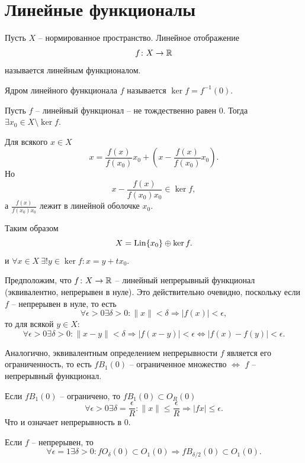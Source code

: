 \section{Линейные функционалы}
\begin{definition}
    Пусть $X$ -- нормированное пространство.
    Линейное отображение
    \[
        f\colon X \to \mathbb{R}
    \]
    называется линейным функционалом.
\end{definition}
\begin{definition}
    Ядром линейного функционала $f$ называется $\ker f = f^{-1}(0)$.
\end{definition}
\begin{note}
    Пусть $f$ -- линейный функционал -- не тождественно равен 0.
    Тогда $\exists x_0 \in X \setminus \ker f$.

    Для всякого $x \in X$ 
    \[
        x = \frac{f(x)}{f(x_0)}x_0 + \left(x - \frac{f(x)}{f(x_0)}x_0\right).
    \]
    Но
    \[
        x - \frac{f(x)}{f(x_0)x_0} \in \ker f,
    \]
    а $\frac{f(x)}{f(x_0)x_0}$ лежит в линейной оболочке $x_0$.

    Таким образом
    \[
        X = \operatorname{Lin}\{x_0\} \oplus \ker f.
    \]
    и $\forall x \in X \ \exists! y \in \ker f\colon x = y + t x_0$.

    Предположим, что $f\colon X \to \mathbb{R}$ -- линейный непрерывный функционал (эквивалентно, непрерывен в нуле).
    Это действительно очевидно, поскольку если $f$ -- непрерывен в нуле, то есть
    \[
        \forall \epsilon > 0 \exists \delta > 0 \colon \|x\| < \delta \Rightarrow |f(x)| < \epsilon,
    \]
    то для всякой $y \in X\colon$
    \[
        \forall \epsilon > 0 \exists \delta > 0 \colon \|x - y\| < \delta \Rightarrow |f(x - y)| < \epsilon \Longleftrightarrow |f(x) - f(y)| < \epsilon.
    \]


    Аналогично, эквивалентным определением непрерывности $f$ является его ограниченность, то есть $fB_1(0)$ -- ограниченное множество $\Longleftrightarrow$ $f$ -- непрерывный функционал.

    Если $fB_1(0)$ -- ограничено, то $fB_1(0) \subset O_R(0)$
    \[
        \forall \epsilon > 0 \exists \delta = \frac{\epsilon}{R}\colon \|x\| \leq \frac{\epsilon}{R} \Rightarrow |fx| \leq \epsilon.
    \]
    Что и означает непрерывность в 0.

    Если $f$ -- непрерывен, то
    \[
        \forall \epsilon = 1 \exists \delta > 0 \colon fO_{\delta}(0) \subset O_1(0) \Rightarrow fB_{\delta/2}(0) \subset O_1(0).
    \]
\end{note}
